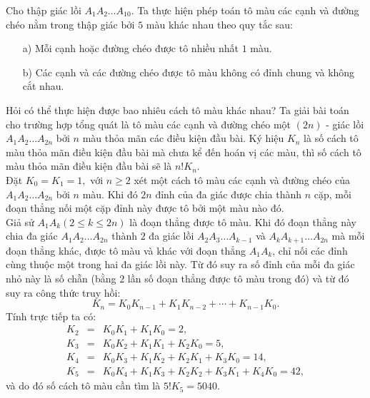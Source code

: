 \begin{bt}%
Cho thập giác lồi $ A_1A_2 \ldots A_{10} $. Ta thực hiện phép toán tô màu các cạnh và đường chéo nằm trong thập giác bởi $ 5 $ màu khác nhau theo quy tắc sau:
\begin{itemize}
\item[a)] Mỗi cạnh hoặc đường chéo được tô nhiều nhất $ 1 $ màu.
\item[b)] Các cạnh và các đường chéo được tô màu không có đỉnh chung và không cắt nhau.
\end{itemize}
Hỏi có thể thực hiện được bao nhiêu cách tô màu khác nhau?
\loigiai
{
Ta giải bài toán cho trường hợp tổng quát là tô màu các cạnh và đường chéo một $ (2n) $ - giác lồi $ A_1A_2 \ldots A_{2n} $ bởi $ n $ màu thỏa mãn các điều kiện đầu bài. Ký hiệu $ K_n $ là số cách tô màu thỏa mãn điều kiện đầu bài mà chưa kể đến hoán vị các màu, thì số cách tô màu thỏa mãn điều kiện đầu bài sẽ là $ n! K_n $.\\
Đặt $ K_0 = K_1 = 1, $ với $ n \geq 2 $ xét một cách tô màu các cạnh và đường chéo của $ A_1A_2 \ldots A_{2n} $ bởi $ n $ màu. Khi đó $ 2n $ đỉnh của đa giác được chia thành $ n $ cặp, mỗi đoạn thẳng nối một cặp đỉnh này được tô bởi một màu nào đó. \\
Giả sử $ A_1A_k (2 \leq k \leq 2n) $ là đoạn thẳng được tô màu. Khi đó đoạn thẳng này chia đa giác $ A_1A_2 \ldots A_{2n} $ thành $ 2 $ đa giác lồi $ A_2A_3 \ldots A_{k-1} $ và $ A_{k}A_{k+1}\ldots A_{2n} $ mà mỗi đoạn thẳng khác, được tô màu và khác với đoạn thẳng $ A_1A_k $, chỉ nối các đỉnh cùng thuộc một trong hai đa giác lồi này. Từ đó suy ra số đỉnh của mỗi đa giác nhỏ này là số chẵn (bằng $ 2 $ lần số đoạn thẳng được tô màu trong đó) và từ đó suy ra công thức truy hồi: $$ K_n = K_0K_{n-1} + K_1K_{n-2} + \cdots + K_{n-1}K_0. $$
Tính trực tiếp ta có:
\begin{align*}
K_2& = &K_0K_1 + K_1K_0=2,\\
K_3& = &K_0K_2+ K_1K_1+K_2K_0=5,\\
K_4 & = & K_0K_3+K_1K_2+K_2K_1+K_3K_0=14,\\
K_5 & = & K_0K_4 + K_1K_3 + K_2K_2+K_3K_1+K_4K_0=42,
\end{align*}
và do đó số cách tô màu cần tìm là $ 5! K_5 = 5040. $
}
\end{bt}
